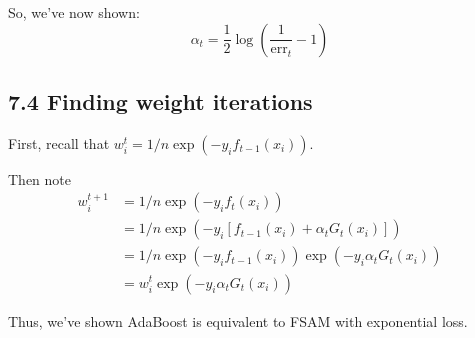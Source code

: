 \documentclass[paper=a4, fontsize=11pt]{scrartcl} %
\numberwithin{equation}{section} %
\numberwithin{figure}{section} %
\numberwithin{table}{section} %
\begin{document}
So, we've now shown:
\[\alpha_t = \frac{1}{2} \log \left(\frac{1}{\textrm{err}_{t}} - 1 \right)\]

\subsection*{7.4 Finding weight iterations}

First, recall that $w_i^{t} = 1/n \exp(-y_i f_{t-1}(x_i))$.

Then note
\begin{align*}
w_i^{t+1} &= 1/n \exp(-y_i f_{t}(x_i)) \\
&= 1/n \exp(-y_i \left[f_{t-1}(x_i) + \alpha_t G_t(x_i)\right]) \\
&= 1/n \exp(-y_i f_{t-1}(x_i))\exp(-y_i \alpha_t G_t(x_i)) \\
&= w_i^{t} \exp(-y_i \alpha_t G_t(x_i))
\end{align*}

Thus, we've shown AdaBoost is equivalent to FSAM with exponential loss.

\end{document}
